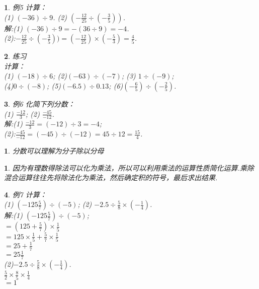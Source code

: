 \documentclass[11pt]{article}
\newtheorem{exercise}{ }
\newtheorem{article}{ }
\newtheorem{tip}{ }
\begin{document}
\begin{exercise}
例5 计算：\\
(1) $ (-36)\div 9 $. (2) $ (- \frac{12}{25} \div (- \frac{3}{5})) $.\\
解:(1) $ (-36)\div 9 = -(36 \div 9) = -4 $.\\

(2):$ - \frac{12}{25} \div (- \frac{3}{5})) = (- \frac{12}{25}) \times (- \frac{5}{3}) = \frac{4}{5} $.\\
\end{exercise}

\begin{exercise}
练习\\

计算：\\
(1) $(-18) \div 6 $;
(2)$(-63) \div (-7)$;
(3) $ 1 \div (-9) $; \\
(4)$ 0 \div (-8) $;
(5)$(-6.5) \div 0.13$;
(6)$(-\frac{6}{5}) \div (-\frac{2}{5})$.
\end{exercise}

\begin{exercise}
例6 化简下列分数：\\
(1) $ \frac{-12}{3} $; (2) $ \frac{-45}{-12} $.\\
解:(1) $ \frac{-12}{3} = (-12) \div 3 = -4 $;\\

(2):$ \frac{-45}{-12} = (-45) \div (-12) = 45 \div 12 = \frac{15}{4} $.\\
\end{exercise}

\begin{tip}
分数可以理解为分子除以分母\\
\end{tip}

\begin{article}
因为有理数得除法可以化为乘法，所以可以利用乘法的运算性质简化运算.乘除混合运算往往先将除法化为乘法，然后确定积的符号，最后求出结果.\\
\end{article}

\begin{exercise}
例7 计算：\\
(1) $ (-125\frac{5}{7}) \div (-5) $; (2) $ -2.5 \div \frac{5}{8} \times (-\frac{1}{4}) $.\\
解:(1) $ (-125\frac{5}{7}) \div (-5) $;\\
$ =(125+ \frac{5}{7}) \times \frac{1}{5}  $\\
$ =125 \times \frac{1}{5} + \frac{5}{7} \times \frac{1}{5} $\\
$ =25 + \frac{1}{7} $\\
$ =25\frac{1}{7} $\\

(2)$ -2.5 \div \frac{5}{8} \times (-\frac{1}{4}) $.\\
$ \frac{5}{2} \times \frac{8}{5} \times \frac{1}{4} $\\
$ =1 $
\end{exercise}
\end{document}
